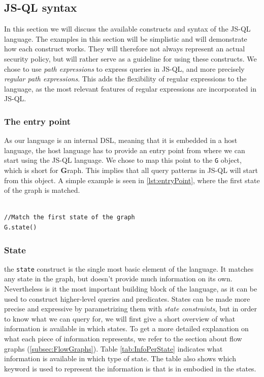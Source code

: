 \subsection{JS-QL syntax}
\label{subsec:Syntax}
 In this section we will discuss the available constructs and syntax of the JS-QL language. The examples in this section will be simplistic and will demonstrate how each construct works. They will therefore not always represent an actual security policy, but will rather serve as a guideline for using these constructs. We chose to use \textit{path expressions} to express queries in JS-QL, and more precisely \textit{regular path expressions}. This adds the flexibility of regular expressions to the language, as the most relevant features of regular expressions are incorporated in JS-QL.

\subsubsection{The entry point}
As our language is an internal DSL, meaning that it is embedded in a host language, the host language has to provide an entry point from where we can start using the JS-QL language. We chose to map this point to the \texttt{G} object, which is short for \textbf{G}raph. This implies that all query patterns in JS-QL will start from this object. A simple example is seen in \ref{lst:entryPoint}, where the first state of the graph is matched.

\begin{lstlisting}[label={lst:entryPoint},language=JSQL,caption=Matching the first state starting from entry point \texttt{G},mathescape=true]  % float=t?

//Match the first state of the graph
G.state()
\end{lstlisting}

\subsubsection{State}
the \texttt{state} construct is the single most basic element of the language. It matches any state in the graph, but doesn't provide much information on its own. Nevertheless is it the most important building block of the language, as it can be used to construct higher-level queries and predicates. States can be made more precise and expressive by parametrizing them with \textit{state constraints}, but in order to know what we can query for, we will first give a short overview of what information is available in which states. To get a more detailed explanation on what each piece of information represents, we refer to the section about flow graphs (\ref{subsec:FlowGraphs}). Table \ref{tab:InfoPerState} indicates what information is available in which type of state. The table also shows which keyword is used to represent the information is that is in embodied in the states.


